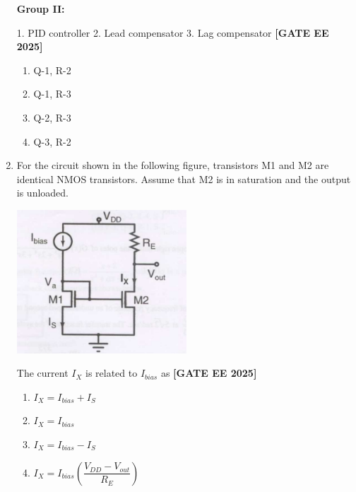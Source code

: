 \documentclass[12pt,a4paper]{article}
\begin{document}
\begin{enumerate}[leftmargin=*, label=\textbf{Q.\arabic*:}]
\textbf{Group II:}

1. PID controller\hspace{1em}
2. Lead compensator\hspace{1em}
3. Lag compensator
\newline
\noindent \textbf{[GATE EE 2025]}
\begin{enumerate}[label=(\Alph*)]
  \item Q-1, R-2
  \item Q-1, R-3
  \item Q-2, R-3
  \item Q-3, R-2
\end{enumerate}

\item For the circuit shown in the following figure, transistors M1 and M2 are identical NMOS transistors. Assume that M2 is in saturation and the output is unloaded.
\begin{center}
\includegraphics[width=0.5\textwidth]{figs/q44.png}
\end{center}

The current $I_X$ is related to $I_{bias}$ as
\newline
\noindent \textbf{[GATE EE 2025]}
\begin{enumerate}[label=(\Alph*)]
  \item $I_X = I_{bias} + I_S$
  \item $I_X = I_{bias}$
  \item $I_X = I_{bias} - I_S$
  \item $I_X = I_{bias}\left( \dfrac{V_{DD} - V_{out}}{R_E} \right)$
\end{enumerate}


\end{enumerate}
\end{document}

